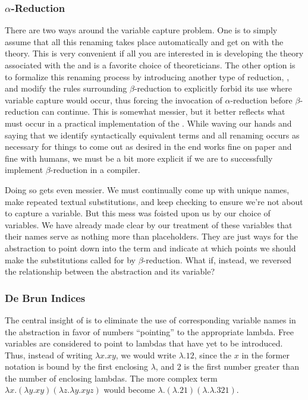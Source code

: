 \subsubsection{\texorpdfstring{$\alpha$-Reduction}{Alpha-Reduction}}\label{untyped:alpha}
There are two ways around the variable capture problem. One is to simply assume that all this renaming takes place automatically and get on with the theory. This is very convenient if all you are interested in is developing the theory associated with the \lambdacalc and is a favorite choice of theoreticians. The other option is to formalize this renaming process by introducing another type of reduction, , and modify the rules surrounding $\beta$-re\-duc\-tion to explicitly forbid its use where variable capture would occur, thus forcing the invocation of $\alpha$-reduction before $\beta$-re\-duc\-tion can continue. This is somewhat messier, but it better reflects what must occur in a practical implementation of the \lambdacalc{}. While waving our hands and saying that we identify syntactically equivalent terms and all renaming occurs as necessary for things to come out as desired in the end works fine on paper and fine with humans, we must be a bit more explicit if we are to successfully implement $\beta$-re\-duc\-tion in a compiler.

Doing so gets even messier. We must continually come up with unique names, make repeated textual substitutions, and keep checking to ensure we're not about to capture a variable. But this mess was foisted upon us by our choice of variables. We have already made clear by our treatment of these variables that their names serve as nothing more than placeholders. They are just ways for the abstraction to point down into the term and indicate at which points we should make the substitutions called for by $\beta$-re\-duc\-tion. What if, instead, we reversed the relationship between the abstraction and its variable?

\subsubsection{De Bru\ij n Indices}\label{untyped:indices}
The central insight of  is to eliminate the use of corresponding variable names in the abstraction in favor of numbers ``pointing'' to the appropriate lambda. Free variables are considered to point to lambdas that have yet to be introduced. Thus, instead of writing $\lambda x . xy$, we would write $\lambda.12$, since the $x$ in the former notation is bound by the first enclosing $\lambda$, and $2$ is the first number greater than the number of enclosing lambdas. The more complex term $\lambda x . (\lambda y . xy) (\lambda z. \lambda y. xyz)$ would become $\lambda . (\lambda . 2 1) (\lambda . \lambda . 321)$.

